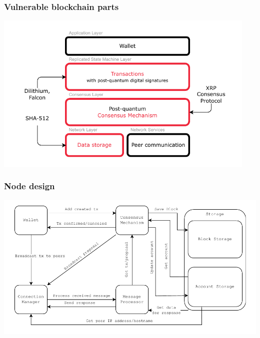 




\begin{frame}
    \frametitle{Vulnerable blockchain parts}
    \centering
    \includegraphics[width=34em]{img/bc-design-algs.pdf}
\end{frame}

\begin{frame}
    \frametitle{Node design}
    \centering
    \includegraphics[width=\textwidth]{img/bc-design-pp.pdf}
\end{frame}

